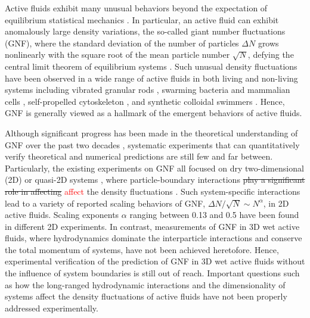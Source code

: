 \documentclass[twocolumn,aps,prx,amsmath,amssymb,longbibliography,superscriptaddress]{revtex4-2}
\begin{document}
Active fluids exhibit many unusual behaviors beyond the expectation of equilibrium statistical mechanics \cite{Ramaswamy2010,Cates2012,Marchetti2013,Poon2013,Elgeti2015}.
In particular, an active fluid can exhibit anomalously large density variations, the so-called giant number fluctuations (GNF), where the standard deviation of the number of particles $\Delta N$ grows nonlinearly with the square root of the mean particle number $\sqrt N$, defying the central limit theorem of equilibrium systems \cite{Mishin2015}.
Such unusual density fluctuations have been observed in a wide range of active fluids in both living and non-living systems including vibrated granular rods \cite{Narayan2007,Aranson2008,Kudrolli2008,Deseigne2010}, swarming bacteria \cite{Zhang2010,Nishiguchi2017} and mammalian cells \cite{Kawaguchi2017},
self-propelled cytoskeleton \cite{Schaller2013}, and synthetic colloidal swimmers \cite{Palacci2013,Karani2019}. Hence, GNF is generally viewed as a hallmark of the emergent behaviors of active fluids.


Although significant progress has been made in the theoretical understanding of GNF over the past two decades \cite{Toner1995, Tu1998, Toner1998, AditiSimha2002, Ramaswamy2003, Toner2005, Chate2008, Mishra2010, Dey2012, Saintillan2012, Saintillan2013, Ngo2014,  Mahault2019}, systematic experiments that can quantitatively verify theoretical and numerical predictions are still few and far between. Particularly, the existing experiments on GNF all focused on dry two-dimensional (2D) or quasi-2D systems \cite{Narayan2007, Aranson2008, Kudrolli2008, Deseigne2010, Zhang2010, Schaller2013, Nishiguchi2017, Kawaguchi2017, Palacci2013}, where particle-boundary interactions \sout{play a significant role in affecting} \textcolor{red}{affect} the density fluctuations \cite{Marchetti2013}.
Such system-specific interactions lead to a variety of reported scaling behaviors of GNF, $\Delta N/\sqrt N \sim N^\alpha$, in 2D active fluids.
Scaling exponents $\alpha$ ranging between 0.13 and 0.5 have been found in different 2D experiments. In contrast, measurements of GNF in 3D wet active fluids, where hydrodynamics dominate the interparticle interactions and conserve the total momentum of systems, have not been achieved heretofore. Hence, experimental verification of the prediction of GNF in 3D wet active fluids without the influence of system boundaries is still out of reach. Important questions such as how the long-ranged hydrodynamic interactions and the dimensionality of systems affect the density fluctuations of active fluids have not been properly addressed experimentally.
\end{document}
